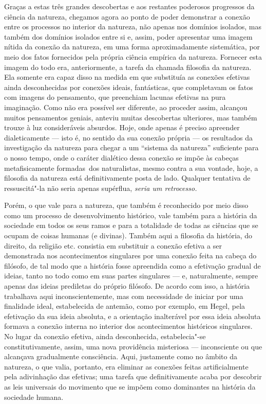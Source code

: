 Graças a estas três grandes descobertas e aos restantes poderosos
progressos da ciência da natureza, chegamos agora ao ponto de poder
demonstrar a conexão entre os processos no interior da natureza, não
apenas nos domínios isolados, mas também dos domínios isolados entre si
e, assim, poder apresentar uma imagem nítida da conexão da natureza, em
uma forma aproximadamente sistemática, por meio dos fatos fornecidos
pela própria ciência empírica da natureza. Fornecer esta imagem do todo
era, anteriormente, a tarefa da chamada filosofia da natureza. Ela
somente era capaz disso na medida em que substituía as conexões
efetivas ainda desconhecidas por conexões ideais, fantásticas, que
completavam os fatos com imagens do pensamento, que preenchiam lacunas
efetivas na pura imaginação. Como não era possível ser diferente, ao
proceder assim, alcançou muitos pensamentos geniais, anteviu muitas
descobertas ulteriores, mas também trouxe à luz consideráveis absurdos.
Hoje, onde apenas é preciso apreender dialeticamente --- isto é, no sentido
da sua conexão própria --- os resultados da investigação da natureza para
chegar a um ``sistema da natureza'' suficiente para o nosso tempo, onde
o caráter dialético dessa conexão se impõe às cabeças metafisicamente
formadas\est\ dos naturalistas, mesmo contra a sua vontade, hoje, a filosofia
da natureza está definitivamente posta de lado. Qualquer tentativa de
ressuscitá"-la não seria apenas supérflua, \emph{seria um retrocesso.}

Porém, o que vale para a natureza, que também é reconhecido por meio
disso como um processo de desenvolvimento histórico, vale também para a
história da sociedade em todos os seus ramos e para a totalidade de
todas as ciências que se ocupam de coisas humanas (e divinas). Também
aqui a filosofia da história, do direito, da religião etc. consistia em
substituir a conexão efetiva a ser demonstrada nos acontecimentos
singulares por uma conexão feita na cabeça do 
filósofo, de tal modo que a história fosse apreendida como a efetivação gradual de ideias, tanto no todo
como em suas partes singulares --- e, naturalmente,
sempre apenas das ideias prediletas do próprio
filósofo. De acordo com isso, a história trabalhava aqui
inconscientemente, mas com necessidade de iniciar por uma finalidade
ideal, estabelecida de antemão, como por exemplo,
em Hegel,
pela efetivação da sua ideia absoluta, e a orientação inalterável por
essa ideia absoluta formava a conexão interna no interior dos
acontecimentos históricos singulares. No lugar da conexão efetiva, ainda
desconhecida, estabelecia"-se constitutivamente, assim,
uma nova providência misteriosa --- inconsciente ou que alcançava gradualmente consciência.
Aqui, justamente como no âmbito da natureza, o
que valia, portanto, era eliminar as conexões feitas artificialmente
pela adivinhação  das efetivas; uma tarefa que
definitivamente acaba por descobrir as leis universais do movimento que
se impõem como dominantes na história da sociedade humana.

